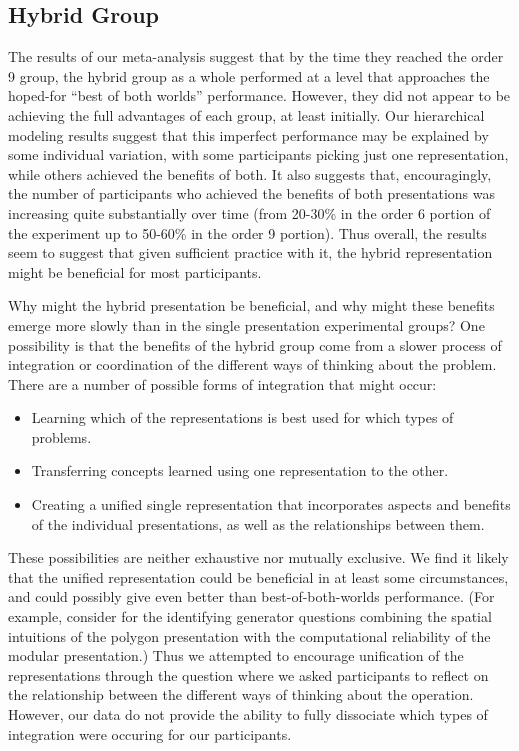 \documentclass[man,10pt]{apa6}
\begin{document}
\subsection{Hybrid Group}
The results of our meta-analysis suggest that by the time they reached the order 9 group, the hybrid group as a whole performed at a level that approaches the hoped-for ``best of both worlds'' performance. However, they did not appear to be achieving the full advantages of each group, at least initially. Our hierarchical modeling results suggest that this imperfect performance may be explained by some individual variation, with some participants picking just one representation, while others achieved the benefits of both. It also suggests that, encouragingly, the number of participants who achieved the benefits of both presentations was increasing quite substantially over time (from 20-30\% in the order 6 portion of the experiment up to 50-60\% in the order 9 portion). Thus overall, the results seem to suggest that given sufficient practice with it, the hybrid representation might be beneficial for most participants.\par 
Why might the hybrid presentation be beneficial, and why might these benefits emerge more slowly than in the single presentation experimental groups? One possibility is that the benefits of the hybrid group come from a slower process of integration or coordination \cite{Schwartz2015} of the different ways of thinking about the problem. There are a number of possible forms of integration that might occur:
\begin{itemize}
\item Learning which of the representations is best used for which types of problems. 
\item Transferring concepts learned using one representation to the other.
\item Creating a unified single representation that incorporates aspects and benefits of the individual presentations, as well as the relationships between them.  
\end{itemize} 
These possibilities are neither exhaustive nor mutually exclusive. We find it likely that the unified representation could be beneficial in at least some circumstances, and could possibly give even better than best-of-both-worlds performance. (For example, consider for the identifying generator questions combining the spatial intuitions of the polygon presentation with the computational reliability of the modular presentation.) Thus we attempted to encourage unification of the representations through the question where we asked participants to reflect on the relationship between the different ways of thinking about the operation. However, our data do not provide the ability to fully dissociate which types of integration were occuring for our participants. \par
\end{document}
